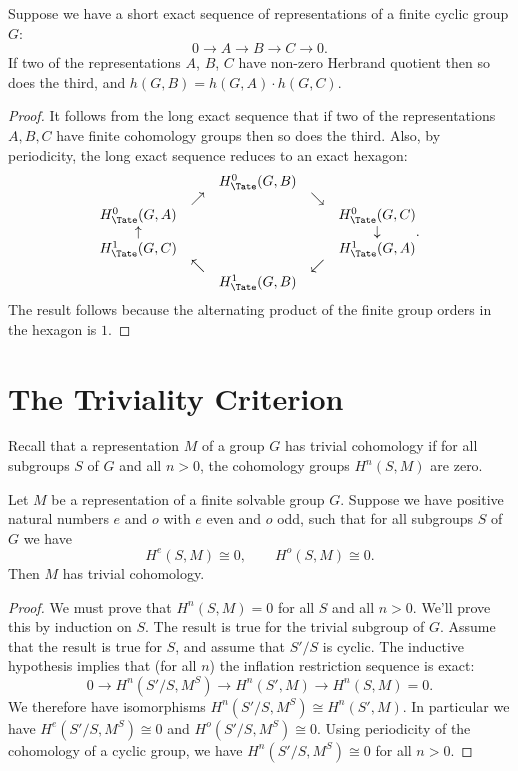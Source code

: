\begin{lemma} \label{lem:herbrand ses}
	Suppose we have a short exact sequence of representations of a finite cyclic group $G$:
	\[
		0 \to A \to B \to C \to 0.
	\]
	If two of the representations $A$, $B$, $C$ have non-zero Herbrand quotient then so
	does the third, and $h(G,B) = h(G,A) \cdot h(G,C)$.
\end{lemma}

\begin{proof}
	It follows from the long exact sequence that if two of the representations $A,B,C$
	have finite cohomology groups then so does the third.
	Also, by periodicity, the long exact sequence reduces to an exact hexagon:
	\[
		\begin{matrix}
			&& H^0_{\Tate}(G,B) \\
			&\nearrow && \searrow \\
			H^0_{\Tate}(G,A)  && && H^0_{\Tate}(G,C) \\
			\uparrow & & & & \downarrow \\
			H^1_{\Tate}(G,C) &&&& H^1_{\Tate}(G,A) \\
			& \nwarrow && \swarrow\\
			&& H^1_{\Tate}(G,B)
		\end{matrix}.
	\]
	The result follows because the alternating product of the
	finite group orders in the hexagon is $1$.
\end{proof}



\section{The Triviality Criterion}

Recall that a representation $M$ of a group $G$ has trivial cohomology if for all subgroups $S$ of
$G$ and all $n > 0$, the cohomology groups $H^{n}(S,M)$ are zero.

\begin{theorem} \label{thm:triviality criterion solvable}
	Let $M$ be a representation of a finite solvable group $G$.
	Suppose we have positive natural numbers $e$ and $o$ with $e$ even and $o$ odd,
	such that for all subgroups $S$ of $G$ we have
	\[
		H^e(S,M) \cong 0, \qquad H^o(S,M) \cong 0.
	\]
	Then $M$ has trivial cohomology.
\end{theorem}

\begin{proof}
	We must prove that $H^{n}(S,M) = 0$ for all $S$ and all $n > 0$.
	We'll prove this by induction on $S$. The result is true for the trivial subgroup of $G$.
	Assume that the result is true for $S$, and assume that $S' / S$ is cyclic.
	The inductive hypothesis implies that (for all $n$) the inflation restriction sequence is exact:
	\[
		0 \to H^{n} (S'/S, M^S) \to H^{n}(S' , M) \to H^{n}(S,M)= 0.
	\]
	We therefore have isomorphisms $H^{n} (S'/S, M^S) \cong H^{n}(S' , M)$.
	In particular we have $H^{e} (S'/S, M^S) \cong 0$ and $H^{o} (S'/S, M^S) \cong 0$.
	Using periodicity of the cohomology of a cyclic group, we have $H^{n}(S'/S,M^S) \cong 0$
	for all $n>0$.
\end{proof}

